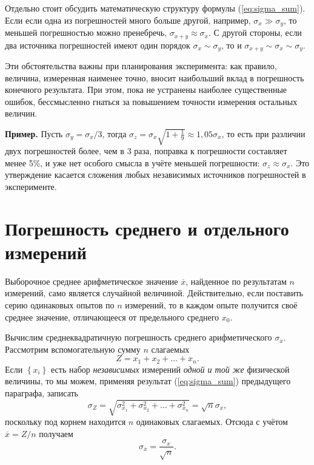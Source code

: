 Отдельно стоит обсудить математическую структуру формулы (\ref{eq:sigma_sum}).
Если если одна из погрешностей много больше другой, например, $\sigma_{x}\gg\sigma_{y}$,
то меньшей погрешностью можно пренебречь, $\sigma_{x+y}\approx\sigma_{x}$.
С другой стороны, если два источника погрешностей имеют один порядок
$\sigma_{x}\sim\sigma_{y}$, то и $\sigma_{x+y}\sim\sigma_{x}\sim\sigma_{y}$. 

Эти обстоятельства важны при планирования эксперимента: как правило,
величина, измеренная наименее точно, вносит наибольший вклад в погрешность
конечного результата. При этом, пока не устранены наиболее существенные
ошибок, бессмысленно гнаться за повышением точности измерения остальных
величин.

\textbf{\footnotesize{}Пример.}{\footnotesize{} Пусть $\sigma_{y}=\sigma_{x}/3$,
тогда $\sigma_{z}=\sigma_{x}\sqrt{1+\frac{1}{9}}\approx1{,}05\sigma_{x}$,
то есть при различии двух погрешностей более, чем в 3 раза, поправка
к погрешности составляет менее 5\%, и уже нет особого смысла в учёте
меньшей погрешности: $\sigma_{z}\approx\sigma_{x}$. Это утверждение
касается сложения любых независимых источников погрешностей в эксперименте.}{\footnotesize\par}

\section{Погрешность среднего и отдельного измерений\label{subsec:average}}

Выборочное среднее арифметическое значение $\overline{x}$, найденное
по результатам $n$ измерений, само является случайной величиной.
Действительно, если поставить серию одинаковых опытов по $n$ измерений,
то в каждом опыте получится своё среднее значение, отличающееся от
предельного среднего $x_{0}$.

Вычислим среднеквадратичную погрешность среднего арифметического $\sigma_{\overline{x}}$.
Рассмотрим вспомогательную сумму $n$ слагаемых 
\[
Z=x_{1}+x_{2}+\ldots+x_{n}.
\]
Если $\left\{ x_{i}\right\} $ есть набор \emph{независимых} измерений
\emph{одной и той же} физической величины, то мы можем, применяя результат
(\ref{eq:sigma_sum}) предыдущего параграфа, записать
\[
\sigma_{Z}=\sqrt{\sigma_{x_{1}}^{2}+\sigma_{x_{2}}^{2}+\ldots+\sigma_{x_{n}}^{2}}=\sqrt{n}\sigma_{x},
\]
поскольку под корнем находится $n$ одинаковых слагаемых. Отсюда с
учётом $\overline{x}=Z/n$ получаем
\begin{equation}
\boxed{{\sigma_{\overline{x}}=\frac{\sigma_{x}}{\sqrt{n}}}}.\label{eq:sigma_avg}
\end{equation}

